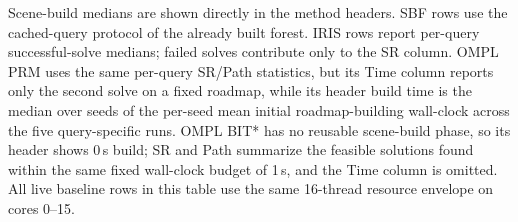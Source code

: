 \begin{table}[t]
\centering
\caption{Marcucci per-query comparison across reusable-region planners and OMPL baselines.}
\label{tab:query}
\scriptsize
\setlength{\tabcolsep}{2.2pt}
{\footnotesize Scene-build medians are shown directly in the method headers. SBF rows use the cached-query protocol of the already built forest. IRIS rows report per-query successful-solve medians; failed solves contribute only to the SR column. OMPL PRM uses the same per-query SR/Path statistics, but its Time column reports only the second solve on a fixed roadmap, while its header build time is the median over seeds of the per-seed mean initial roadmap-building wall-clock across the five query-specific runs. OMPL BIT* has no reusable scene-build phase, so its header shows 0\,s build; SR and Path summarize the feasible solutions found within the same fixed wall-clock budget of 1\,s, and the Time column is omitted. All live baseline rows in this table use the same 16-thread resource envelope on cores 0--15.}
\end{table}
